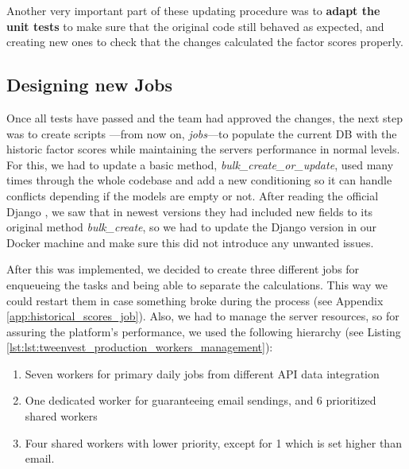 \documentclass[11pt,english,a4paper,hidelinks]{book}
\begin{document}
\vspace{0.5cm}
\noindent Another very important part of these updating procedure was to \textbf{adapt the unit tests} to make sure that the original code still behaved as expected, and creating new ones to check that the changes calculated the factor scores properly.

\subsection{Designing new Jobs}

Once all tests have passed and the team had approved the changes, the next step was to create scripts —from now on, \textit{jobs}—to populate the current DB with the historic factor scores while maintaining the servers performance in normal levels. For this, we had to update a basic method, \textit{bulk\_create\_or\_update}, used many times through the whole codebase and add a new conditioning so it can handle conflicts depending if the models are empty or not. After reading the official Django \textcite{django2025queryset}, we saw that in newest versions they had included new fields to its original method \textit{bulk\_create}, so we had to update the Django version in our Docker machine and make sure this did not introduce any unwanted issues.

\vspace{0.5cm}
\noindent After this was implemented, we decided to create three different jobs for enqueueing the tasks and being able to separate the calculations. This way we could restart them in case something broke during the process (see Appendix \ref{app:historical_scores_job}). Also, we had to manage the server resources, so for assuring the platform's performance, we used the following hierarchy (see Listing \ref{lst:lst:tweenvest_production_workers_management}):
\begin{enumerate}
    \item Seven workers for primary daily jobs from different API data integration
    \item One dedicated worker for guaranteeing email sendings, and 6 prioritized shared workers
    \item Four shared workers with lower priority, except for 1 which is set higher than email.
\end{enumerate}
\end{document}
